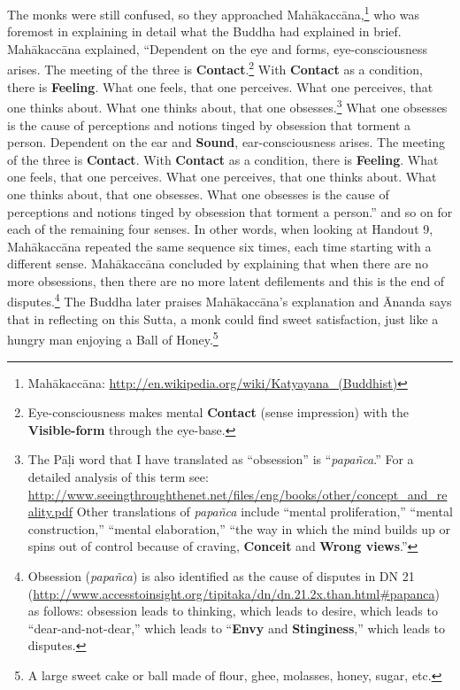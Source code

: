 The monks were still confused, so they approached Mahākaccāna,\footnote{Mahākaccāna: \url{http://en.wikipedia.org/wiki/Katyayana_(Buddhist)}} who was foremost in explaining in detail what the Buddha had explained in brief. Mahākaccāna explained, “Dependent on the eye and forms, eye-consciousness arises. The meeting of the three is \textbf{Contact}.\footnote{Eye-consciousness makes mental \textbf{Contact} (sense impression) with the \textbf{Visible-form} through the eye-base.} With \textbf{Contact} as a condition, there is \textbf{Feeling}. What one feels, that one perceives. What one perceives, that one thinks about. What one thinks about, that one obsesses.\footnote{The Pāḷi word that I have translated as “obsession” is “\textit{papañca}.” For a detailed analysis of this term see: \url{http://www.seeingthroughthenet.net/files/eng/books/other/concept_and_reality.pdf} Other translations of \textit{papañca} include “mental proliferation,” “mental construction,” “mental elaboration,” “the way in which the mind builds up or spins out of control because of craving, \textbf{Conceit} and \textbf{Wrong views}.”} What one obsesses is the cause of perceptions and notions tinged by obsession that torment a person. Dependent on the ear and \textbf{Sound}, ear-consciousness arises. The meeting of the three is \textbf{Contact}. With \textbf{Contact} as a condition, there is \textbf{Feeling}. What one feels, that one perceives. What one perceives, that one thinks about. What one thinks about, that one obsesses. What one obsesses is the cause of perceptions and notions tinged by obsession that torment a person.” and so on for each of the remaining four senses. In other words, when looking at Handout 9, Mahākaccāna repeated the same sequence six times, each time starting with a different sense. Mahākaccāna concluded by explaining that when there are no more obsessions, then there are no more latent defilements and this is the end of disputes.\footnote{Obsession (\textit{papañca}) is also identified as the cause of disputes in DN 21 (\url{http://www.accesstoinsight.org/tipitaka/dn/dn.21.2x.than.html\#papanca}) as follows: obsession leads to thinking, which leads to desire, which leads to “dear-and-not-dear,” which leads to “\textbf{Envy} and \textbf{Stinginess},” which leads to disputes.} The Buddha later praises Mahākaccāna’s explanation and Ānanda says that in reflecting on this Sutta, a monk could find sweet satisfaction, just like a hungry man enjoying a Ball of Honey.\footnote{A large sweet cake or ball made of flour, ghee, molasses, honey, sugar, etc.}

